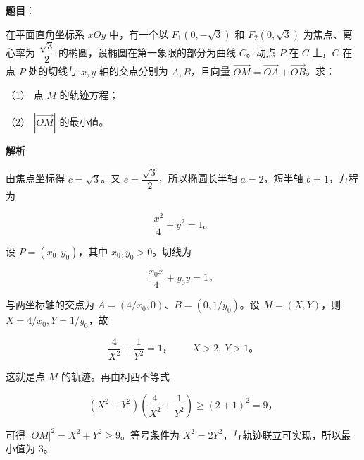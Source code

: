 \begin{answer}

\textbf{题目}：

在平面直角坐标系 $xOy$ 中，有一个以 $F_1(0,-\sqrt3)$ 和 $F_2(0,\sqrt3)$ 为焦点、离心率为 $\dfrac{\sqrt3}{2}$ 的椭圆，设椭圆在第一象限的部分为曲线 $C$。动点 $P$ 在 $C$ 上，$C$ 在点 $P$ 处的切线与 $x,y$ 轴的交点分别为 $A,B$，且向量 $\overrightarrow{OM}=\overrightarrow{OA}+\overrightarrow{OB}$。求：

（1） 点 $M$ 的轨迹方程；

（2） $|\overrightarrow{OM}|$ 的最小值。

\textbf{解析}


由焦点坐标得 $c=\sqrt3$。又 $e=\dfrac{\sqrt3}{2}$，所以椭圆长半轴 $a=2$，短半轴 $b=1$，方程为

\nopagebreak[4]
\[
\frac{x^2}{4}+y^2=1\text{。}
\]

设 $P=(x_0,y_0)$，其中 $x_0,y_0>0$。切线为

\nopagebreak[4]
\[
\frac{x_0x}{4}+y_0y=1\text{，}
\]

与两坐标轴的交点为 $A=(4/x_0,0)$、$B=(0,1/y_0)$。设 $M=(X,Y)$，则 $X=4/x_0,Y=1/y_0$，故

\nopagebreak[4]
\[
\frac4{X^2}+\frac1{Y^2}=1\text{，}\qquad X>2,\ Y>1\text{。}
\]

这就是点 $M$ 的轨迹。再由柯西不等式


\nopagebreak[4]
\[
(X^2+Y^2)\left(\frac4{X^2}+\frac1{Y^2}\right)\geqslant(2+1)^2=9\text{，}
\]

可得 $|OM|^2=X^2+Y^2\geqslant9$。等号条件为 $X^2=2Y^2$，与轨迹联立可实现，所以最小值为 $3$。



\end{answer}
